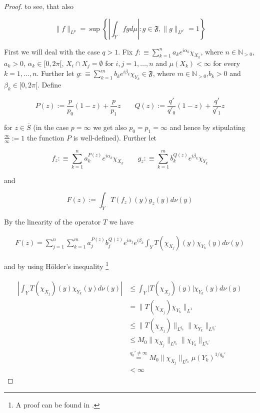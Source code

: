 \begin{proof}
	to see, that also

	\begin{equation*}
		\|f\|_{L^p} = \sup \left\{ \left\vert \int_Y fgd\mu\right\vert : g \in \mathfrak{F},\|g\|_{L^{p'}} = 1\right\}
	\end{equation*}

	First we will deal with the case \underline{$q > 1$}. Fix $f :\equiv \sum_{k = 1}^n a_k e^{i\alpha_k}\chi_{X_k}$, where $n \in \mathbb{N}_{>0}$,$a_k > 0$, $\alpha_k \in [0,2\pi[$, $X_i \cap X_j = \emptyset$ for $i,j = 1,\hdots,n$ and $\mu(X_k) < \infty$ for every $k = 1,\hdots,n$. Further let $g :\equiv \sum_{k = 1}^m b_k e^{i\beta_k}\chi_{Y_k} \in \mathfrak{F}$, where $m \in \mathbb{N}_{>0}$,$b_k > 0$ and $\beta_k \in [0,2\pi[$. Define

				\begin{equation*}
					P(z) := \frac{p}{p_0}(1 - z) + \frac{p}{p_1}z \qquad Q(z) := \frac{q'}{q'_0}(1 - z) + \frac{q'}{q'_1}z
				\end{equation*}

				for $z \in \overline{S}$ (in the case $p = \infty$ we get also $p_0 = p_1 = \infty$ and hence by stipulating $\frac{\infty}{\infty}:= 1$ the function $P$ is well-defined). Further let
				
				\begin{equation}
					f_z :\equiv \sum_{k = 1}^n a^{P(z)}_k e^{i\alpha_k}\chi_{X_k} \qquad g_z :\equiv  \sum_{k = 1}^m b^{Q(z)}_k e^{i\beta_k}\chi_{Y_k}
					\label{def:fzgz}
				\end{equation}
				
				and 

				\begin{equation}
					F(z) := \int_Y T(f_z)(y)g_z(y)d\nu(y)
				\end{equation}

				By the linearity of the operator $T$ we have

				\begin{gather}
					F(z) = \sum_{j = 1}^n\sum_{k = 1}^m a^{P(z)}_j b_j^{Q(z)} e^{i\alpha_j} e^{i\beta_k} \int_YT(\chi_{X_j})(y)\chi_{Y_k}(y)d\nu(y) 
				\end{gather}

				and by using H\"older's inequality \footnote{A proof can be found in \cite[223]{elstrodt:mass:2011}.}

				\begin{gather}
					\begin{aligned}
						\left\vert \int_YT(\chi_{X_j})(y)\chi_{Y_k}(y)d\nu(y) \right\vert &\leqslant \int_Y\vert T(\chi_{X_j})(y)\vert \chi_{Y_k}(y)d\nu(y)\\
						&= \|T(\chi_{X_j})\chi_{Y_k}\|_{L^1}\\
						&\leqslant \|T(\chi_{X_j})\|_{L^{q_0}} \|\chi_{Y_k}\|_{L^{q_0'}}\\
						&\leqslant M_0\|\chi_{X_j}\|_{L^{p_0}} \|\chi_{Y_k}\|_{L^{q_0'}}\\
						&\overset{q_0' \neq \infty}{=} M_0\|\chi_{X_j}\|_{L^{p_0}} \mu(Y_k)^{1/q_0'}\\ 
						&< \infty
					\end{aligned}
				\end{gather}


\end{proof}
